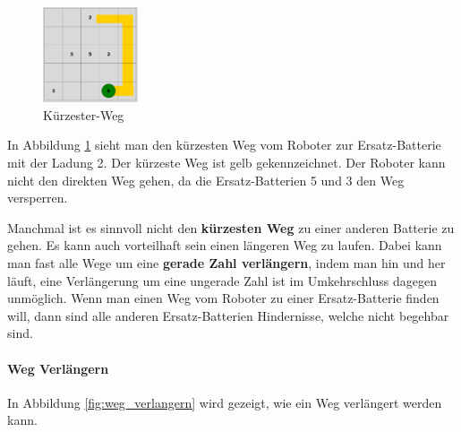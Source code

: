 \documentclass[a4paper,12pt,arial]{scrartcl}
\begin{document}
\captionsetup[figure]{name=Abb.}
\begin{figure}
\vspace{-10pt}
    \includegraphics[width=0.25\textwidth]{shortest_w.pdf}
    \vspace{-25pt}
    \caption{Kürzester-Weg}
    \label{fig:weg}
\vspace{-20pt}
\end{figure}
\captionsetup[figure]{name=Abbildung}
In Abbildung \ref{fig:weg}  sieht man den kürzesten Weg vom Roboter zur Ersatz-Batterie mit der Ladung 2. Der kürzeste Weg ist gelb gekennzeichnet. Der Roboter kann nicht den direkten Weg gehen, da die Ersatz-Batterien 5 und 3 den Weg versperren.

Manchmal ist es sinnvoll nicht den \textbf{kürzesten Weg} zu einer anderen Batterie zu gehen.
Es kann auch vorteilhaft sein einen längeren Weg zu laufen. Dabei kann man fast alle Wege um eine \textbf{gerade Zahl verlängern}, indem man hin und her läuft, eine Verlängerung um eine ungerade Zahl ist im Umkehrschluss dagegen unmöglich.
Wenn man einen Weg vom Roboter zu einer Ersatz-Batterie finden will, dann sind alle anderen Ersatz-Batterien Hindernisse, welche nicht begehbar sind.





\paragraph{Weg Verlängern}


In Abbildung \ref{fig:weg_verlangern} wird gezeigt, wie ein Weg verlängert werden kann.
\end{document}
